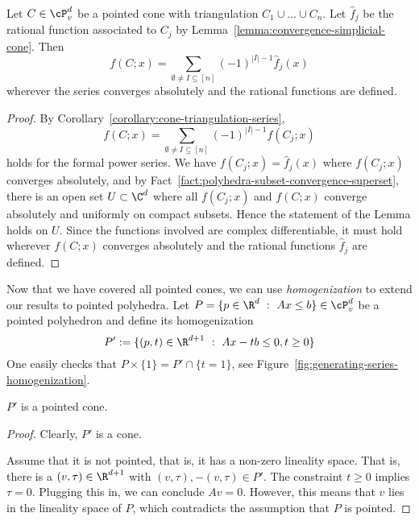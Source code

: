 \begin{lemma}
  \label{lemma:pointed-cone-rational-function}
  Let $C \in \cP_v^d$ be a pointed cone
  with triangulation $C_1 \cup \dots \cup C_n$.
  Let $\hat f_j$ be the rational function associated to $C_j$ by Lemma~\ref{lemma:convergence-simplicial-cone}.
  Then
  \[
    f(C;x) = \sum_{\emptyset \neq I \subseteq [n]} (-1)^{|I| - 1} \hat f_j(x)
  \]
  wherever the series converges absolutely and the rational functions are defined.
\end{lemma}
\begin{proof}
  By Corollary~\ref{corollary:cone-triangulation-series},
  \[
    f(C;x) = \sum_{\emptyset \neq I \subseteq [n]} (-1)^{|I| - 1} f(C_j;x)
  \]
  holds for the formal power series.
  We have $f(C_j;x) = \hat f_j(x)$ where $f(C_j;x)$ converges absolutely,
  and by Fact~\ref{fact:polyhedra-subset-convergence-superset},
  there is an open set $U \subset \C^d$ where all $f(C_j;x)$ and $f(C;x)$
  converge absolutely and uniformly on compact subsets.
  Hence the statement of the Lemma holds on $U$.
  Since the functions involved are complex differentiable,
  it must hold wherever $f(C;x)$ converges absolutely and the rational functions $\hat f_j$ are defined.
\end{proof}

Now that we have covered all pointed cones,
we can use \emph{homogenization} to extend our results to pointed polyhedra.
Let $P = \{ p \in \R^d ~:~ Ax \leq b \} \in \cP_v^d$ be a pointed polyhedron and define its homogenization
\[
  P' := \{ (p,t) \in \R^{d+1} ~:~ Ax - tb \leq 0, t \geq 0 \}
\]
One easily checks that $P \times \{ 1 \} = P' \cap \{ t = 1\}$, see Figure~\ref{fig:generating-series-homogenization}.

\begin{lemma}
  $P'$ is a pointed cone.
\end{lemma}
\begin{proof}
  Clearly, $P'$ is a cone.

  Assume that it is not pointed, that is, it has a non-zero lineality space.
  That is, there is a $(v,\tau) \in \R^{d + 1}$ with $(v,\tau),-(v,\tau) \in P'$.
  The constraint $t \geq 0$ implies $\tau = 0$.
  Plugging this in, we can conclude $Av = 0$.
  However, this means that $v$ lies in the lineality space of $P$,
  which contradicts the assumption that $P$ is pointed.
\end{proof}

